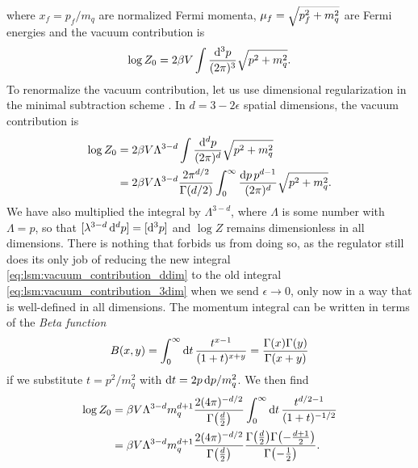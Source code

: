 where $x_f = p_f / m_q$ are normalized Fermi momenta, $\mu_f = \smash{\sqrt{p_f^2 + m_q^2}}$ are Fermi energies and the vacuum contribution is
\begin{equation}
	\log Z_0 = 2 \beta V \int \frac{\mathop{}\!\mathrm{d}^3 p}{(2 \pi)^3} \sqrt{p^2 + m_q^2 } .
\label{eq:lsm:vacuum_contribution_3dim}
\end{equation}
To renormalize the vacuum contribution, let us use dimensional regularization in the minimal subtraction scheme .
In $d = 3 - 2 \epsilon$ spatial dimensions, the vacuum contribution is
\begin{equation}
\begin{split}
	\log Z_0 &= 2 \beta V \Lambda^{3-d} \int \frac{\mathop{}\!\mathrm{d}^d p}{(2 \pi)^d} \sqrt{p^2 + m_q^2} \\
	         &= 2 \beta V \Lambda^{3-d} \frac{2 \pi^{d/2}}{\Gamma(d/2)} \int_0^\infty \frac{\mathop{}\!\mathrm{d} p \, p^{d-1}}{(2 \pi)^d} \sqrt{p^2 + m_q^2} .
\end{split}
\label{eq:lsm:vacuum_contribution_ddim}
\end{equation}
We have also multiplied the integral by $\Lambda^{3-d}$,
where $\Lambda$ is some number with $\unit{\Lambda} = \unit{p}$,
so that $[\lambda^{3-d} \mathop{}\!\mathrm{d}^d p] = [\mathop{}\!\mathrm{d}^3 p]$ and $\log Z$ remains dimensionless in all dimensions.
There is nothing that forbids us from doing so, 
as the regulator still does its only job of reducing the new integral \eqref{eq:lsm:vacuum_contribution_ddim} to the old integral \eqref{eq:lsm:vacuum_contribution_3dim} when we send $\epsilon \rightarrow 0$,
only now in a way that is well-defined in all dimensions.
The momentum integral can be written in terms of the \emph{Beta function}
\begin{equation}
	B(x,y) = \int_0^\infty \mathop{}\!\mathrm{d} t \, \frac{t^{x-1}}{(1+t)^{x+y}} = \frac{\Gamma(x) \Gamma(y)}{\Gamma(x+y)}
\end{equation}
if we substitute $t = p^2/m_q^2$ with $\mathop{}\!\mathrm{d} t = 2 p \mathop{}\!\mathrm{d} p / m_q^2$.
We then find
\begin{equation}
\begin{split}
	\log Z_0 &= \beta V \Lambda^{3-d} m_q^{d+1} \frac{2 (4 \pi)^{-d/2}}{\Gamma\big(\frac{d}{2}\big)} \int_0^\infty \mathop{}\!\mathrm{d} t \, \frac{t^{d/2-1}}{(1+t)^{-1/2}} \\
	         &= \beta V \Lambda^{3-d} m_q^{d+1} \frac{2 (4 \pi)^{-d/2}}{\Gamma\big(\frac{d}{2}\big)} \frac{\Gamma\big(\frac{d}{2}\big) \Gamma\big( \textstyle{-\frac{d+1}{2}} \big)}{\Gamma\big( \textstyle{-\frac{1}{2}} \big)} .
\end{split}
\end{equation}

